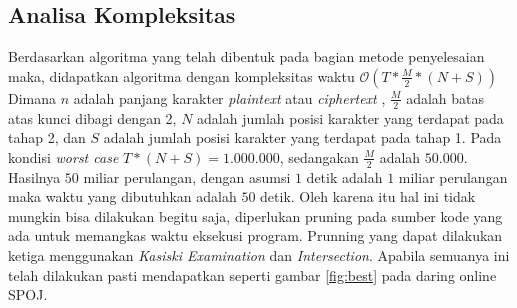 \subsection{Analisa Kompleksitas}
Berdasarkan algoritma yang telah dibentuk pada bagian metode penyelesaian maka, didapatkan algoritma dengan kompleksitas waktu $\mathcal{O}(T*\frac{M}{2}*(N+S))$ 
	Dimana $n$ adalah panjang karakter \textit{plaintext} atau \textit{ciphertext} , $\frac{M}{2}$ adalah batas atas kunci dibagi dengan 2, $N$ adalah jumlah posisi karakter yang terdapat pada tahap 2, dan $S$ adalah jumlah posisi karakter yang terdapat pada tahap 1. Pada kondisi \textit{worst case} $T*(N+S)=1.000.000$, sedangakan $\frac{M}{2}$ adalah $50.000$. Hasilnya $50$ miliar perulangan, dengan asumsi $1$ detik adalah $1$ miliar perulangan maka waktu yang dibutuhkan adalah $50$ detik. Oleh karena itu hal ini tidak mungkin bisa dilakukan begitu saja, diperlukan pruning pada sumber kode yang ada untuk memangkas waktu eksekusi program. Prunning yang dapat dilakukan ketiga menggunakan \textit{Kasiski Examination} dan \textit{Intersection}. Apabila semuanya ini telah dilakukan pasti mendapatkan seperti gambar \ref{fig:best} pada daring online SPOJ.


